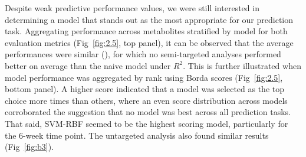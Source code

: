 Despite weak predictive performance values, we were still interested in determining a model that stands out as the most appropriate for our prediction task. Aggregating performance across metabolites stratified by model for both evaluation metrics (Fig~\ref{fig:2.5}, top panel), it can be observed that the average performances were similar (), for which no semi-targeted analyses performed better on average than the naive model under $R^2$. This is further illustrated when model performance was aggregated by rank using Borda scores (Fig~\ref{fig:2.5}, bottom panel). A higher score indicated that a model was selected as the top choice more times than others, where an even score distribution across models corroborated the suggestion that no model was best across all prediction tasks. That said, SVM-RBF seemed to be the highest scoring model, particularly for the 6-week time point. The untargeted analysis also found similar results (Fig~\ref{fig:b3}).

